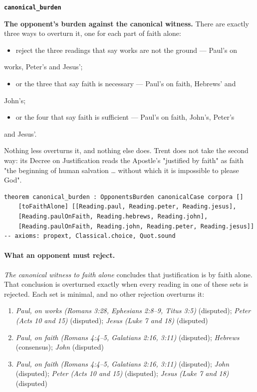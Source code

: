 \documentclass[11pt]{article}
\begin{document}
\par\medskip\noindent\textbf{\texttt{canonical\_\allowbreak{}burden}}\par\nobreak\noindent
\textbf{The opponent's burden against the canonical witness.} There are exactly three ways to overturn it, one for each part of faith alone:

\begin{itemize}
  \item reject the three readings that say works are not the ground — Paul's on
\end{itemize}
  works, Peter's and Jesus';

\begin{itemize}
  \item or the three that say faith is necessary — Paul's on faith, Hebrews' and
\end{itemize}
  John's;

\begin{itemize}
  \item or the four that say faith is sufficient — Paul's on faith, John's, Peter's
\end{itemize}
  and Jesus'.

Nothing less overturns it, and nothing else does. Trent does not take the second way: its Decree on Justification reads the Apostle's "justified by faith" as faith "the beginning of human salvation … without which it is impossible to please God".

{\small\begin{verbatim}
theorem canonical_burden : OpponentsBurden canonicalCase corpora []
    [toFaithAlone] [[Reading.paul, Reading.peter, Reading.jesus],
    [Reading.paulOnFaith, Reading.hebrews, Reading.john],
    [Reading.paulOnFaith, Reading.john, Reading.peter, Reading.jesus]]
-- axioms: propext, Classical.choice, Quot.sound
\end{verbatim}}
\paragraph{What an opponent must reject.} \emph{The canonical witness to faith alone} concludes that justification is by faith alone. That conclusion is overturned exactly when every reading in one of these sets is rejected. Each set is minimal, and no other rejection overturns it:
\begin{enumerate}
\item \emph{Paul, on works (Romans 3:28, Ephesians 2:8–9, Titus 3:5)} (disputed); \emph{Peter (Acts 10 and 15)} (disputed); \emph{Jesus (Luke 7 and 18)} (disputed)
\item \emph{Paul, on faith (Romans 4:4–5, Galatians 2:16, 3:11)} (disputed); \emph{Hebrews} (consensus); \emph{John} (disputed)
\item \emph{Paul, on faith (Romans 4:4–5, Galatians 2:16, 3:11)} (disputed); \emph{John} (disputed); \emph{Peter (Acts 10 and 15)} (disputed); \emph{Jesus (Luke 7 and 18)} (disputed)
\end{enumerate}
\end{document}
